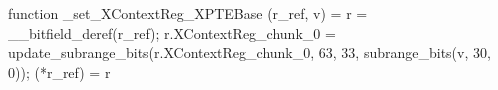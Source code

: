 function _set_XContextReg_XPTEBase (r_ref, v) = {
    r = __bitfield_deref(r_ref);
    r.XContextReg_chunk_0 = update_subrange_bits(r.XContextReg_chunk_0, 63, 33, subrange_bits(v, 30, 0));
    (*r_ref) = r
}
